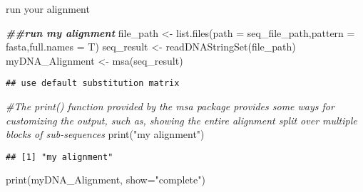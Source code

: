 \documentclass[
]{article}
\newenvironment{Shaded}{\begin{snugshade}}{\end{snugshade}}
\newcommand{\AttributeTok}[1]{\textcolor[rgb]{0.77,0.63,0.00}{#1}}
\newcommand{\CommentTok}[1]{\textcolor[rgb]{0.56,0.35,0.01}{\textit{#1}}}
\newcommand{\DocumentationTok}[1]{\textcolor[rgb]{0.56,0.35,0.01}{\textbf{\textit{#1}}}}
\newcommand{\FunctionTok}[1]{\textcolor[rgb]{0.00,0.00,0.00}{#1}}
\newcommand{\NormalTok}[1]{#1}
\newcommand{\OtherTok}[1]{\textcolor[rgb]{0.56,0.35,0.01}{#1}}
\newcommand{\StringTok}[1]{\textcolor[rgb]{0.31,0.60,0.02}{#1}}
\begin{document}
run your alignment

\begin{Shaded}
\begin{Highlighting}[]
\DocumentationTok{\#\#run my alignment}
\NormalTok{file\_path }\OtherTok{\textless{}{-}} \FunctionTok{list.files}\NormalTok{(}\AttributeTok{path =}\NormalTok{ seq\_file\_path,}\AttributeTok{pattern =} \StringTok{\textquotesingle{}fasta\textquotesingle{}}\NormalTok{,}\AttributeTok{full.names =}\NormalTok{ T)}
\NormalTok{seq\_result }\OtherTok{\textless{}{-}} \FunctionTok{readDNAStringSet}\NormalTok{(file\_path)}
\NormalTok{myDNA\_Alignment }\OtherTok{\textless{}{-}} \FunctionTok{msa}\NormalTok{(seq\_result)}
\end{Highlighting}
\end{Shaded}

\begin{verbatim}
## use default substitution matrix
\end{verbatim}

\begin{Shaded}
\begin{Highlighting}[]
\CommentTok{\#The print() function provided by the msa package provides some ways for customizing the output, such as, showing the entire alignment split over multiple blocks of sub{-}sequences}
\FunctionTok{print}\NormalTok{(}\StringTok{"my alignment"}\NormalTok{)}
\end{Highlighting}
\end{Shaded}

\begin{verbatim}
## [1] "my alignment"
\end{verbatim}

\begin{Shaded}
\begin{Highlighting}[]
\FunctionTok{print}\NormalTok{(myDNA\_Alignment, }\AttributeTok{show=}\StringTok{"complete"}\NormalTok{)}
\end{Highlighting}
\end{Shaded}
\end{document}
